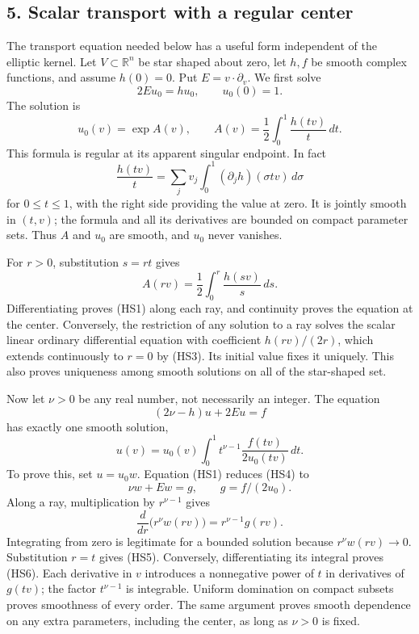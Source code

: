 \documentclass[
  11pt,
]{article}
\begin{document}
\subsection{5. Scalar transport with a regular
center}\label{scalar-transport-with-a-regular-center}

The transport equation needed below has a useful form independent of the
elliptic kernel. Let \(V\subset\mathbb R^n\) be star shaped about zero,
let \(h,f\) be smooth complex functions, and assume \(h(0)=0\). Put
\(E=v\cdot\partial_v\). We first solve \[
                       2Eu_0=hu_0,\qquad u_0(0)=1.            \tag{HS1}
\] The solution is \[
 u_0(v)=\exp A(v),\qquad
                  A(v)=\frac12\int_0^1\frac{h(tv)}t\,dt.       \tag{HS2}
\] This formula is regular at its apparent singular endpoint. In fact \[
 \frac{h(tv)}t
       =\sum_jv_j\int_0^1(\partial_jh)(\sigma tv)\,d\sigma       \tag{HS3}
\] for \(0\leq t\leq1\), with the right side providing the value at
zero. It is jointly smooth in \((t,v)\); the formula and all its
derivatives are bounded on compact parameter sets. Thus \(A\) and
\(u_0\) are smooth, and \(u_0\) never vanishes.

For \(r>0\), substitution \(s=rt\) gives \[
 A(rv)=\frac12\int_0^r\frac{h(sv)}s\,ds.
\] Differentiating proves (HS1) along each ray, and continuity proves
the equation at the center. Conversely, the restriction of any solution
to a ray solves the scalar linear ordinary differential equation with
coefficient \(h(rv)/(2r)\), which extends continuously to \(r=0\) by
(HS3). Its initial value fixes it uniquely. This also proves uniqueness
among smooth solutions on all of the star-shaped set.

Now let \(\nu>0\) be any real number, not necessarily an integer. The
equation \[
                     (2\nu-h)u+2Eu=f                         \tag{HS4}
\] has exactly one smooth solution, \[
       u(v)=u_0(v)\int_0^1
                   t^{\nu-1}\frac{f(tv)}{2u_0(tv)}\,dt.        \tag{HS5}
\] To prove this, set \(u=u_0w\). Equation (HS1) reduces (HS4) to \[
                             \nu w+Ew=g,
                      \qquad g=f/(2u_0).                       \tag{HS6}
\] Along a ray, multiplication by \(r^{\nu-1}\) gives \[
             \frac d{dr}\bigl(r^\nu w(rv)\bigr)
                               =r^{\nu-1}g(rv).                \tag{HS7}
\] Integrating from zero is legitimate for a bounded solution because
\(r^\nu w(rv)\to0\). Substitution \(r=t\) gives (HS5). Conversely,
differentiating its integral proves (HS6). Each derivative in \(v\)
introduces a nonnegative power of \(t\) in derivatives of \(g(tv)\); the
factor \(t^{\nu-1}\) is integrable. Uniform domination on compact
subsets proves smoothness of every order. The same argument proves
smooth dependence on any extra parameters, including the center, as long
as \(\nu>0\) is fixed.
\end{document}
